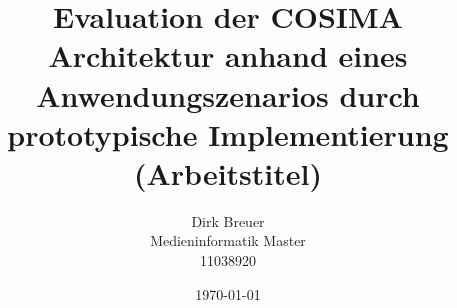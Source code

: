 \documentclass[12pt,headsepline,DIV12,BCOR12mm,a4paper,oneside,cleardoublestandard,openany,bibtotoc,liststotoc,halfparskip]{scrbook}
\begin{document}
\titlehead{
	{\large Fachhochschule Köln --- Campus Gummersbach\\
		\hfill }
	Steinmüllerallee~1\\
	51643 Gummersbach
	}
	\title{Evaluation der COSIMA Architektur anhand eines Anwendungszenarios durch prototypische Implementierung (Arbeitstitel)}
	\author{Dirk Breuer\\Medieninformatik Master\\11038920}
	\publishers{
		\center
		\vspace{0.5cm}
		\large University of Applied Science of Cologne\\\textbf{Erstprüfer:} Prof. Dr. Mario Winter\\
		\large University of Applied Science of Cologne\\\textbf{Zweitprüfer:} Prof. Dr. Mario Winter\\
		\vspace{0.5cm}
    \large \href{mailto:dirk.breuer@gmail.com}{\emph{dirk.breuer@gmail.com}}
		}
	\date{\today}


\frontmatter

\newpage
% 
\newpage
% 

\mainmatter

% 


\appendix

% 



% 

\end{document}
